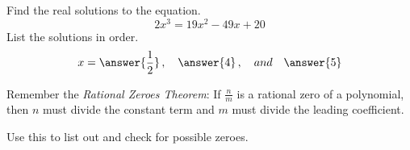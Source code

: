 \documentclass{ximera}
\author{Carl Stitz \and Jeff Zeager \and Bobby Ramsey}
\begin{document}
\begin{exercise}
	Find the real solutions to the equation.
	\[ 2x^3 = 19x^2 - 49 x + 20 \]
	List the solutions in order.
	\[ x = \answer{\frac{1}{2}} \, , \quad  \answer{4}\, , \quad and \quad \answer{5} \]
	\begin{feedback}
		Remember the \emph{Rational Zeroes Theorem}: If $\frac{n}{m}$ is a rational zero of a polynomial, then
		$n$ must divide the constant term and $m$ must divide the leading coefficient.  
		
		Use this to list out and check for possible zeroes.
	\end{feedback}
\end{exercise}
\end{document}
